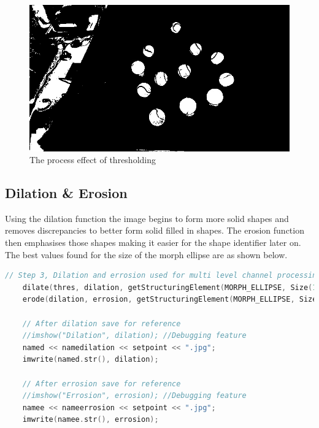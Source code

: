 \documentclass[a4paper, 10pt]{article}
\begin{document}
\begin{figure}[H]
  \includegraphics[width=\linewidth]{images/Thresholding}
  \caption{The process effect of thresholding}
  \label{fig:The process effect of thresholding}
\end{figure}

\clearpage
\subsection{Dilation \& Erosion}

Using the dilation function the image begins to form more solid shapes and removes discrepancies to better form solid filled in shapes. The erosion function then emphasises those shapes making it easier for the shape identifier later on. The best values found for the size of the morph ellipse are as shown below.

\begin{lstlisting}[language = C++]
	// Step 3, Dilation and errosion used for multi level channel processing 
	dilate(thres, dilation, getStructuringElement(MORPH_ELLIPSE, Size(11, 11)));
	erode(dilation, errosion, getStructuringElement(MORPH_ELLIPSE, Size(3, 3)));

	// After dilation save for reference
	//imshow("Dilation", dilation); //Debugging feature
	named << namedilation << setpoint << ".jpg";
	imwrite(named.str(), dilation);

	// After errosion save for reference
	//imshow("Errosion", errosion); //Debugging feature
	namee << nameerrosion << setpoint << ".jpg";
	imwrite(namee.str(), errosion);
\end{lstlisting}
\end{document}
